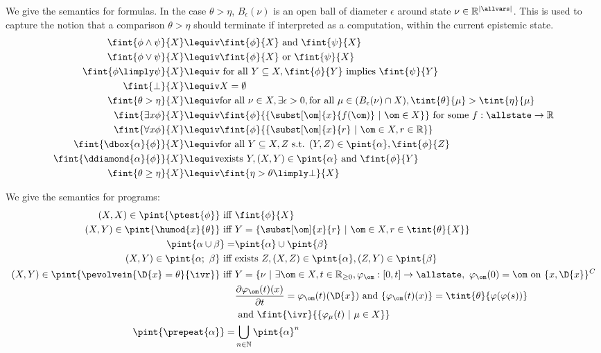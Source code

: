 We give the semantics for formulas.
In the case $\theta > \eta$, $B_\epsilon(\nu)$ is an open ball of diameter $\epsilon$ around state $\nu \in \mathbb{R}^{|\allvars|}$.
This is used to capture the notion that a comparison $\theta > \eta$ should terminate if interpreted as a computation, within the current epistemic state.
\begin{align*}
  \fint{\phi \land \psi}{X}     &\lequiv \fint{\phi}{X}\text{ and }\fint{\psi}{X}\\
  \fint{\phi \lor \psi}{X}      &\lequiv \fint{\phi}{X}\text{ or }\fint{\psi}{X}\\
  \fint{\phi \limply \psi}{X}   &\lequiv \text{ for all }Y \subseteq X, \fint{\phi}{Y}\text{ implies }\fint{\psi}{Y}\\
  \fint{\bot}{X}                &\lequiv X = \emptyset\\
  \fint{\theta > \eta}{X}       &\lequiv \text{for all }\nu \in X, \exists \epsilon > 0, \text{for all } \mu \in (B_\epsilon(\nu) \cap X), \tint{\theta}{\mu} > \tint{\eta}{\mu}\\
  \fint{\exists{x}{\phi}}{X}    &\lequiv \fint{\phi}{\{\subst[\om]{x}{f(\om)}~|~\om \in X\}} \text{ for some $f:\allstate \to \mathbb{R}$}\\
  \fint{\forall{x}{\phi}}{X}    &\lequiv \fint{\phi}{\{\subst[\om]{x}{r}~|~\om \in X,  r \in \mathbb{R}\}}\\
  \fint{\dbox{\alpha}{\phi}}{X} &\lequiv \text{for all }Y \subseteq X, Z \text{ s.t. }(Y,Z) \in \pint{\alpha}, \fint{\phi}{Z}\\
  \fint{\ddiamond{\alpha}{\phi}}{X} &\lequiv \text{exists }Y, (X,Y)\in\pint{\alpha}\text{ and }\fint{\phi}{Y}\\
  \fint{\theta \geq \eta}{X}    &\lequiv \fint{\eta > \theta \limply \bot}{X}%
\end{align*}

We give the semantics for programs:
\begin{align*}
  (X,X) \in \pint{\ptest{\phi}}\text{ iff }&\fint{\phi}{X} \\
  (X,Y) \in \pint{\humod{x}{\theta}} \text{ iff }& Y = \{\subst[\om]{x}{r}~|~\om \in X, r \in \tint{\theta}{X}\}\\
  \pint{\alpha \cup \beta} =& \pint{\alpha} \cup \pint{\beta}\\
  (X,Y) \in \pint{\alpha;~\beta} \text{ iff }& \text{exists }Z, (X,Z) \in \pint{\alpha}, (Z,Y) \in \pint{\beta}\\
  (X,Y) \in \pint{\pevolvein{\D{x}=\theta}{\ivr}}\text{ iff }& Y = \{\nu~|~\exists \om \in X, t \in \mathbb{R}_{\geq0}, \varphi_\om:[0,t]\to\allstate,~\varphi_\om(0)=\om\text{ on }\{x,\D{x}\}^C\\
   &\frac{\partial \varphi_\om(t)(x)}{\partial t}= \varphi_\om(t)(\D{x})\text{ and } \{\varphi_\om(t)(x)\}=\tint{\theta}{\varphi(\varphi(s))}\\
   &\text{ and }\fint{\ivr}{\{\varphi_\mu(t)~|~\mu\in X}\}\\
  \pint{\prepeat{\alpha}} =& \bigcup_{n\in\mathbb{N}} \pint{\alpha}^n
\end{align*}
